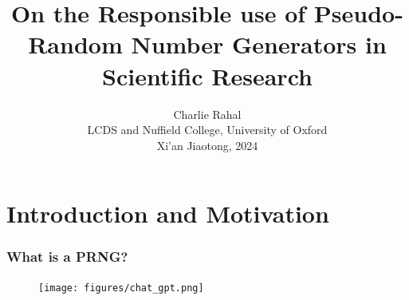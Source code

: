 \documentclass[12pt]{beamer}
\begin{document}
\section{Introduction and Motivation}

\title{On the Responsible use of Pseudo-Random Number Generators in Scientific Research} \vspace{-0.25in}
\author{\footnotesize{Charlie Rahal\\ \vspace{0.05in} LCDS and Nuffield College, University of Oxford\\\vspace{.1in}Xi'an Jiaotong, 2024}\\ \vspace{-0.15in}}
 \date{}

\begin{frame}
\frametitle{What is a PRNG?}
\begin{figure}
	\texttt{[image: figures/chat\_gpt.png]}
\end{figure}
\end{frame}
\end{document}
